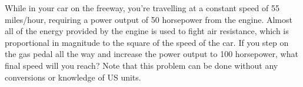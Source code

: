 While in your car on the freeway, you're travelling at a constant
speed of 55 miles/hour, requiring a power output of 50
horsepower from the engine. Almost all of the energy provided by the
engine is used to fight air resistance, which is
proportional in magnitude to the square of the speed of the car. If
you step on the gas pedal all the way and increase the power output
to 100 horsepower, what final speed will you reach? Note that this
problem can be done without any conversions or knowledge of US units.\answercheck
